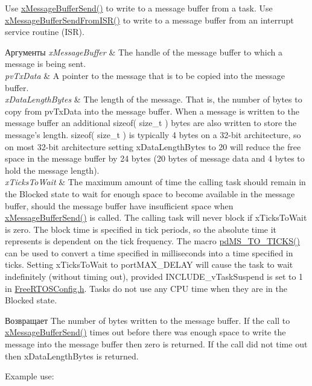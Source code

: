 \begin{DoxyPre}
\begin{DoxyPre}   Use \mbox{\hyperlink{message__buffer_8h_a858f6da6fe24a226c45caf1634ea1605}{xMessageBufferSend()}} to write to a message buffer from a task.  Use
   \mbox{\hyperlink{message__buffer_8h_aeef5b0c4f8c2db6ca2230a8874813e79}{xMessageBufferSendFromISR()}} to write to a message buffer from an interrupt
   service routine (ISR).\end{DoxyPre}
\end{DoxyPre}



\begin{DoxyPre}
\begin{DoxyPre}
\begin{DoxyParams}{Аргументы}
{\em xMessageBuffer} & The handle of the message buffer to which a message is
   being sent.\\
\hline
{\em pvTxData} & A pointer to the message that is to be copied into the
   message buffer.\\
\hline
{\em xDataLengthBytes} & The length of the message.  That is, the number of
   bytes to copy from pvTxData into the message buffer.  When a message is
   written to the message buffer an additional sizeof( size\_t ) bytes are also
   written to store the message's length.  sizeof( size\_t ) is typically 4 bytes
   on a 32-bit architecture, so on most 32-bit architecture setting
   xDataLengthBytes to 20 will reduce the free space in the message buffer by 24
   bytes (20 bytes of message data and 4 bytes to hold the message length).\\
\hline
{\em xTicksToWait} & The maximum amount of time the calling task should remain
   in the Blocked state to wait for enough space to become available in the
   message buffer, should the message buffer have insufficient space when
   \mbox{\hyperlink{message__buffer_8h_a858f6da6fe24a226c45caf1634ea1605}{xMessageBufferSend()}} is called.  The calling task will never block if
   xTicksToWait is zero.  The block time is specified in tick periods, so the
   absolute time it represents is dependent on the tick frequency.  The macro
   \mbox{\hyperlink{projdefs_8h_a353d0f62b82a402cb3db63706c81ec3f}{pdMS\_TO\_TICKS()}} can be used to convert a time specified in milliseconds into
   a time specified in ticks.  Setting xTicksToWait to portMAX\_DELAY will cause
   the task to wait indefinitely (without timing out), provided
   INCLUDE\_vTaskSuspend is set to 1 in \mbox{\hyperlink{_free_r_t_o_s_config_8h}{FreeRTOSConfig.h}}.  Tasks do not use any
   CPU time when they are in the Blocked state.\\
\hline
\end{DoxyParams}
\begin{DoxyReturn}{Возвращает}
The number of bytes written to the message buffer.  If the call to
   \mbox{\hyperlink{message__buffer_8h_a858f6da6fe24a226c45caf1634ea1605}{xMessageBufferSend()}} times out before there was enough space to write the
   message into the message buffer then zero is returned.  If the call did not
   time out then xDataLengthBytes is returned.
\end{DoxyReturn}
Example use:


\end{DoxyPre}
\end{DoxyPre}
